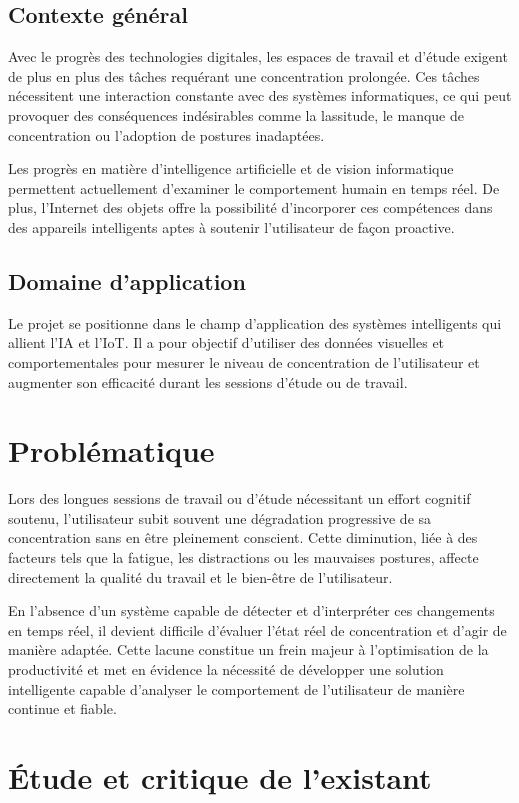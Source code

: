 \subsection{Contexte général}
Avec le progrès des technologies digitales, les espaces de travail et d'étude exigent de plus en plus des tâches requérant une concentration prolongée. Ces tâches nécessitent une interaction constante avec des systèmes informatiques, ce qui peut provoquer des conséquences indésirables comme la lassitude, le manque de concentration ou l'adoption de postures inadaptées.

Les progrès en matière d'intelligence artificielle et de vision informatique permettent actuellement d'examiner le comportement humain en temps réel. De plus, l'Internet des objets offre la possibilité d'incorporer ces compétences dans des appareils intelligents aptes à soutenir l'utilisateur de façon proactive.

\subsection{Domaine d'application}
Le projet se positionne dans le champ d'application des systèmes intelligents qui allient l'\ac{IA} et l'\ac{IoT}. Il a pour objectif d'utiliser des données visuelles et comportementales pour mesurer le niveau de concentration de l'utilisateur et augmenter son efficacité durant les sessions d'étude ou de travail.

\section{Problématique}
Lors des longues sessions de travail ou d'étude nécessitant un effort cognitif soutenu, l'utilisateur subit souvent une dégradation progressive de sa concentration sans en être pleinement conscient. Cette diminution, liée à des facteurs tels que la fatigue, les distractions ou les mauvaises postures, affecte directement la qualité du travail et le bien-être de l'utilisateur.

En l'absence d'un système capable de détecter et d'interpréter ces changements en temps réel, il devient difficile d'évaluer l'état réel de concentration et d'agir de manière adaptée. Cette lacune constitue un frein majeur à l'optimisation de la productivité et met en évidence la nécessité de développer une solution intelligente capable d'analyser le comportement de l'utilisateur de manière continue et fiable.
\section{Étude et critique de l'existant}

